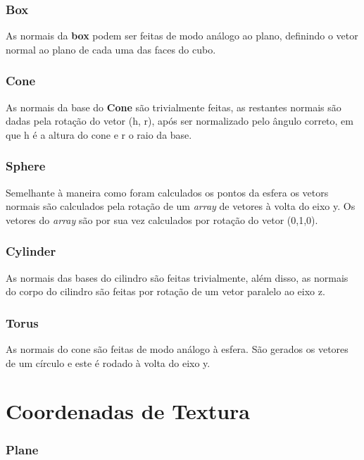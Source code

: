 \documentclass[14pt, a4 paper]{report}
\begin{document}
\subsubsection{Box}

As normais da \textbf{box} podem ser feitas de modo análogo ao plano, definindo o vetor normal ao plano de cada uma das faces do cubo.

\subsubsection{Cone}

As normais da base do \textbf{Cone} são trivialmente feitas, as restantes normais são dadas pela rotação do vetor (h, r), após ser normalizado pelo ângulo correto, em que h é a altura do cone e r o raio da base.

\subsubsection{Sphere}

Semelhante à maneira como foram calculados os pontos da esfera os vetors normais são calculados pela rotação de um \textit{array} de vetores à volta do eixo y. Os vetores do \textit{array} são por sua vez calculados por rotação do vetor (0,1,0).

\subsubsection{Cylinder}

As normais das bases do cilindro são feitas trivialmente, além disso, as normais do corpo do cilindro são feitas por rotação de um vetor paralelo ao eixo z.

\subsubsection{Torus}

As normais do cone são feitas de modo análogo à esfera.
São gerados os vetores de um círculo e este é rodado à volta do eixo y.

\section{Coordenadas de Textura}

\subsubsection{Plane}
\end{document}
